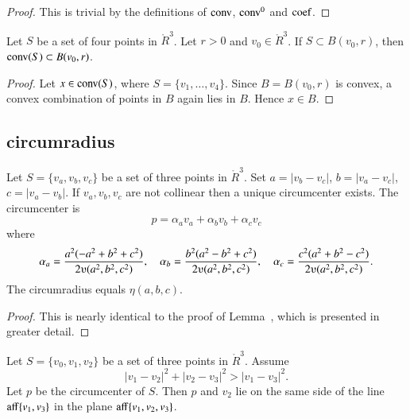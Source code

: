 \begin{proof}  This is trivial by the definitions
of ${\operatorname{conv}}$, ${\operatorname{conv}}^0$ and ${\operatorname{coef}}$.
\end{proof}

\newpage

\begin{lemma}
Let $S$ be a set of four points in $\ring{R}^3$.
Let $r>0$ and $v_0\in\ring{R}^3$.  If $S\subset B(v_0,r)$, then
${\operatorname{conv}}(S)\subset B(v_0,r)$.
\end{lemma}

\begin{proof}  Let $x\in {\operatorname{conv}}(S)$, where $S=\{v_1,\ldots,v_4\}$.
Since $B=B(v_0,r)$ is convex,  a convex combination of points in $B$
again lies in $B$.  Hence $x\in B$.
\end{proof}


\newpage
\subsection{circumradius}




\begin{lemma}
Let $S= \{v_a,v_b,v_c\}$ be a set of three points in $\ring{R}^3$.
Set $a = |v_b
- v_c|$, $b = |v_a - v_c|$, $c = |v_a  - v_b |$.  If $v_a,v_b,v_c$
are not collinear then a unique circumcenter exists.  The circumcenter is
    $$p = \alpha_a v_a + \alpha_b v_b + \alpha_c v_c$$
where
    $$%
    \alpha_a = \frac{a^2(- a^2 + b^2 + c^2)}{2\ups(a^2,b^2,c^2)},\quad
    \alpha_b = \frac{b^2(a^2 - b^2 + c^2)}{2\ups(a^2,b^2,c^2)},\quad
    \alpha_c = \frac{c^2(a^2 + b^2 - c^2)}{2\ups(a^2,b^2,c^2)}.
    $$
The circumradius equals $\eta(a,b,c)$.
\end{lemma}


\begin{proof} This is nearly identical to the proof of 
Lemma~, which is presented in greater detail.
\end{proof}
\newpage

\begin{lemma}
Let  $S=\{v_0,v_1,v_2\}$ be a set of three points
in $\ring{R}^3$. Assume 
   $$
   |v_1-v_2|^2 + |v_2-v_3|^2 > |v_1-v_3|^2.
   $$
Let $p$ be the circumcenter of $S$.
Then $p$ and $v_2$ lie on the same side of the line ${\operatorname{aff}}\{v_1,v_3\}$
in the plane ${\operatorname{aff}}\{v_1,v_2,v_3\}$.
\end{lemma}

